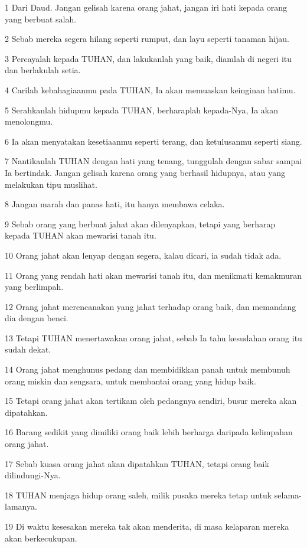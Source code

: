 \par 1 Dari Daud. Jangan gelisah karena orang jahat, jangan iri hati kepada orang yang berbuat salah.
\par 2 Sebab mereka segera hilang seperti rumput, dan layu seperti tanaman hijau.
\par 3 Percayalah kepada TUHAN, dan lakukanlah yang baik, diamlah di negeri itu dan berlakulah setia.
\par 4 Carilah kebahagiaanmu pada TUHAN, Ia akan memuaskan keinginan hatimu.
\par 5 Serahkanlah hidupmu kepada TUHAN, berharaplah kepada-Nya, Ia akan menolongmu.
\par 6 Ia akan menyatakan kesetiaanmu seperti terang, dan ketulusanmu seperti siang.
\par 7 Nantikanlah TUHAN dengan hati yang tenang, tunggulah dengan sabar sampai Ia bertindak. Jangan gelisah karena orang yang berhasil hidupnya, atau yang melakukan tipu muslihat.
\par 8 Jangan marah dan panas hati, itu hanya membawa celaka.
\par 9 Sebab orang yang berbuat jahat akan dilenyapkan, tetapi yang berharap kepada TUHAN akan mewarisi tanah itu.
\par 10 Orang jahat akan lenyap dengan segera, kalau dicari, ia sudah tidak ada.
\par 11 Orang yang rendah hati akan mewarisi tanah itu, dan menikmati kemakmuran yang berlimpah.
\par 12 Orang jahat merencanakan yang jahat terhadap orang baik, dan memandang dia dengan benci.
\par 13 Tetapi TUHAN menertawakan orang jahat, sebab Ia tahu kesudahan orang itu sudah dekat.
\par 14 Orang jahat menghunus pedang dan membidikkan panah untuk membunuh orang miskin dan sengsara, untuk membantai orang yang hidup baik.
\par 15 Tetapi orang jahat akan tertikam oleh pedangnya sendiri, busur mereka akan dipatahkan.
\par 16 Barang sedikit yang dimiliki orang baik lebih berharga daripada kelimpahan orang jahat.
\par 17 Sebab kuasa orang jahat akan dipatahkan TUHAN, tetapi orang baik dilindungi-Nya.
\par 18 TUHAN menjaga hidup orang saleh, milik pusaka mereka tetap untuk selama-lamanya.
\par 19 Di waktu kesesakan mereka tak akan menderita, di masa kelaparan mereka akan berkecukupan.
